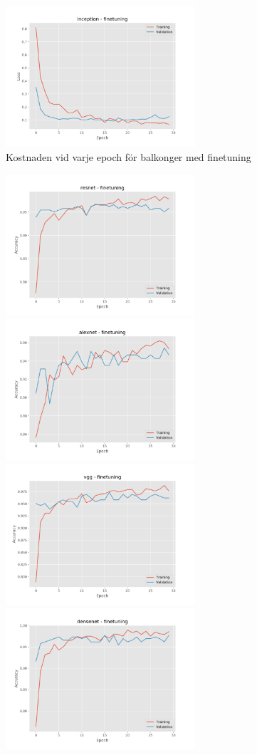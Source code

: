 \documentclass[]{kththesis}
\begin{document}
\begin{figure}[h]
    \includegraphics[width=7cm]{b_l_inception_fine}
    \caption{Kostnaden vid varje epoch för balkonger med finetuning}
    \label{fig:b_l_2}
  \end{figure}
  
  \begin{figure}[h]
    \includegraphics[width=7cm]{b_a_resnet_fine}
    \includegraphics[width=7cm]{b_a_alexnet_fine}
    \includegraphics[width=7cm]{b_a_vgg_fine}
    \includegraphics[width=7cm]{b_a_densenet_fine}

\end{figure}
\end{document}
